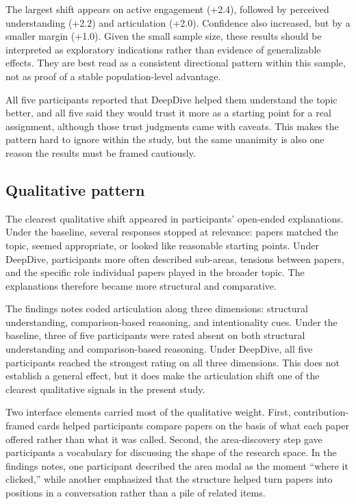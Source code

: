 \documentclass[manuscript,screen]{acmart}
\begin{document}
The largest shift appears on active engagement (+2.4), followed by perceived understanding (+2.2) and articulation (+2.0). Confidence also increased, but by a smaller margin (+1.0). Given the small sample size, these results should be interpreted as exploratory indications rather than evidence of generalizable effects. They are best read as a consistent directional pattern within this sample, not as proof of a stable population-level advantage.

All five participants reported that DeepDive helped them understand the topic better, and all five said they would trust it more as a starting point for a real assignment, although those trust judgments came with caveats. This makes the pattern hard to ignore within the study, but the same unanimity is also one reason the results must be framed cautiously.

\subsection{Qualitative pattern}
The clearest qualitative shift appeared in participants' open-ended explanations. Under the baseline, several responses stopped at relevance: papers matched the topic, seemed appropriate, or looked like reasonable starting points. Under DeepDive, participants more often described sub-areas, tensions between papers, and the specific role individual papers played in the broader topic. The explanations therefore became more structural and comparative.

The findings notes coded articulation along three dimensions: structural understanding, comparison-based reasoning, and intentionality cues. Under the baseline, three of five participants were rated absent on both structural understanding and comparison-based reasoning. Under DeepDive, all five participants reached the strongest rating on all three dimensions. This does not establish a general effect, but it does make the articulation shift one of the clearest qualitative signals in the present study.

Two interface elements carried most of the qualitative weight. First, contribution-framed cards helped participants compare papers on the basis of what each paper offered rather than what it was called. Second, the area-discovery step gave participants a vocabulary for discussing the shape of the research space. In the findings notes, one participant described the area modal as the moment ``where it clicked,'' while another emphasized that the structure helped turn papers into positions in a conversation rather than a pile of related items.
\end{document}
